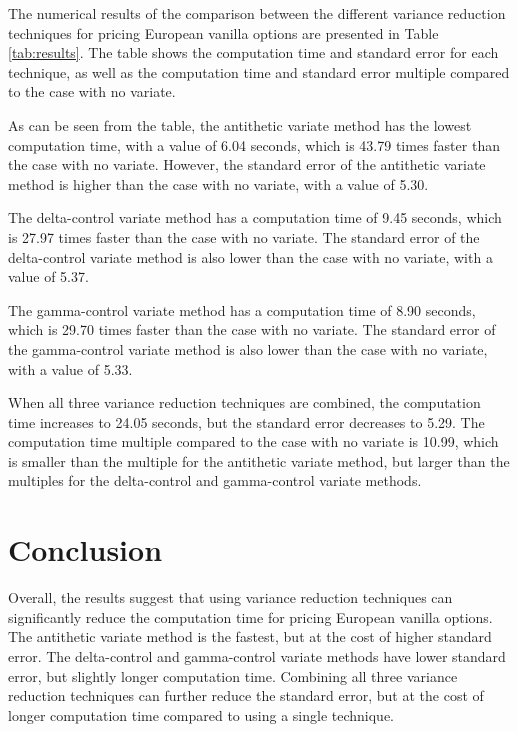 \documentclass[11pt, a4paper, leqno]{article}
\begin{document}
The numerical results of the comparison between the different variance reduction techniques for pricing European vanilla options are presented in Table \ref{tab:results}. The table shows the computation time and standard error for each technique, as well as the computation time and standard error multiple compared to the case with no variate.

As can be seen from the table, the antithetic variate method has the lowest computation time, with a value of 6.04 seconds, which is 43.79 times faster than the case with no variate. However, the standard error of the antithetic variate method is higher than the case with no variate, with a value of 5.30.

The delta-control variate method has a computation time of 9.45 seconds, which is 27.97 times faster than the case with no variate. The standard error of the delta-control variate method is also lower than the case with no variate, with a value of 5.37.

The gamma-control variate method has a computation time of 8.90 seconds, which is 29.70 times faster than the case with no variate. The standard error of the gamma-control variate method is also lower than the case with no variate, with a value of 5.33.

When all three variance reduction techniques are combined, the computation time increases to 24.05 seconds, but the standard error decreases to 5.29. The computation time multiple compared to the case with no variate is 10.99, which is smaller than the multiple for the antithetic variate method, but larger than the multiples for the delta-control and gamma-control variate methods.

\section{Conclusion}\label{sec:conclusion}

Overall, the results suggest that using variance reduction techniques can significantly reduce the computation time for pricing European vanilla options. The antithetic variate method is the fastest, but at the cost of higher standard error. The delta-control and gamma-control variate methods have lower standard error, but slightly longer computation time. Combining all three variance reduction techniques can further reduce the standard error, but at the cost of longer computation time compared to using a single technique.






\printbibliography
{}



\end{document}
